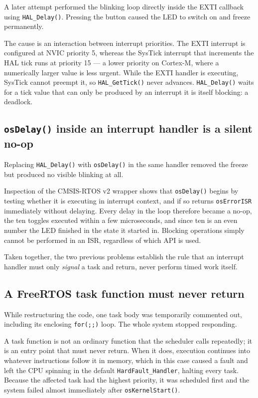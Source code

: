 \documentclass[11pt,a4paper]{article}
\begin{document}
A later attempt performed the blinking loop directly inside the EXTI callback
using \texttt{HAL\_Delay()}. Pressing the button caused the LED to switch on
and freeze permanently.

The cause is an interaction between interrupt priorities. The EXTI interrupt
is configured at NVIC priority 5, whereas the SysTick interrupt that
increments the HAL tick runs at priority 15 --- a lower priority on Cortex-M,
where a numerically larger value is less urgent. While the EXTI handler is
executing, SysTick cannot preempt it, so \texttt{HAL\_GetTick()} never
advances. \texttt{HAL\_Delay()} waits for a tick value that can only be
produced by an interrupt it is itself blocking: a deadlock.

\subsection{\texttt{osDelay()} inside an interrupt handler is a silent no-op}

Replacing \texttt{HAL\_Delay()} with \texttt{osDelay()} in the same handler
removed the freeze but produced no visible blinking at all.

Inspection of the CMSIS-RTOS v2 wrapper shows that \texttt{osDelay()} begins by
testing whether it is executing in interrupt context, and if so returns
\texttt{osErrorISR} immediately without delaying. Every delay in the loop
therefore became a no-op, the ten toggles executed within a few microseconds,
and since ten is an even number the LED finished in the state it started in.
Blocking operations simply cannot be performed in an ISR, regardless of which
API is used.

Taken together, the two previous problems establish the rule that an interrupt
handler must only \emph{signal} a task and return, never perform timed work
itself.

\subsection{A FreeRTOS task function must never return}

While restructuring the code, one task body was temporarily commented out,
including its enclosing \texttt{for(;;)} loop. The whole system stopped
responding.

A task function is not an ordinary function that the scheduler calls
repeatedly; it is an entry point that must never return. When it does,
execution continues into whatever instructions follow it in memory, which in
this case caused a fault and left the CPU spinning in the default
\texttt{HardFault\_Handler}, halting every task. Because the affected task had
the highest priority, it was scheduled first and the system failed almost
immediately after \texttt{osKernelStart()}.
\end{document}
